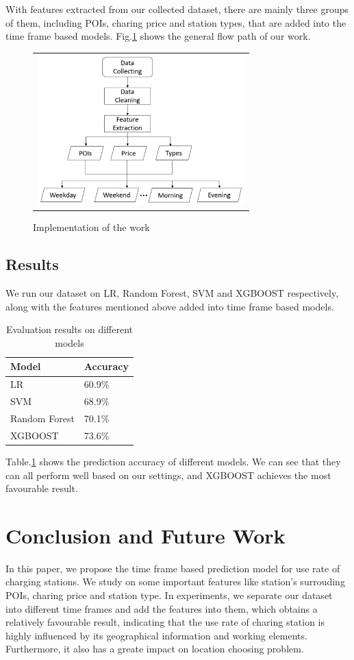 \documentclass[conference]{IEEEtran}
\begin{document}
With features extracted from our collected dataset, there are mainly three groups of them, including POIs, charing price and station types, that are added into the time frame based models. Fig.\ref{fig4} shows the general flow path of our work.

\begin{figure}[htbp]
	\begin{tabular}{c}
		\includegraphics[width=80mm]{path.pdf}
	\end{tabular}
	\centering
	\caption{Implementation of the work}
	\label{fig4}
\end{figure}

\subsection{Results}
We run our dataset on LR, Random Forest, SVM and XGBOOST respectively, along with the features mentioned above added into time frame based models.
\begin{table}[htbp]
	\caption{Evaluation results on different models}
	\begin{center}
		\begin{tabular}{|l|l|}
			\hline
			Model & Accuracy\\
			\hline
			LR & 60.9\%\\
			\hline
			SVM & 68.9\%\\
			\hline
			Random Forest & 70.1\%\\
			\hline
			XGBOOST & 73.6\%\\
			\hline
		\end{tabular}
		\label{tab2}
	\end{center}
\end{table}
Table.\ref{tab2} shows the prediction accuracy of different models. We can see that they can all perform well based on our settings, and XGBOOST achieves the most favourable result.

\section{Conclusion and Future Work}
In this paper, we propose the time frame based prediction model for use rate of charging stations. We study on some important features like station's surrouding POIs, charing price and station type. In experiments, we separate our dataset into different time frames and add the features into them, which obtains a relatively favourable result, indicating that the use rate of charing station is highly influenced by its geographical information and working elements. Furthermore, it also has a greate impact on location choosing problem.
\end{document}
